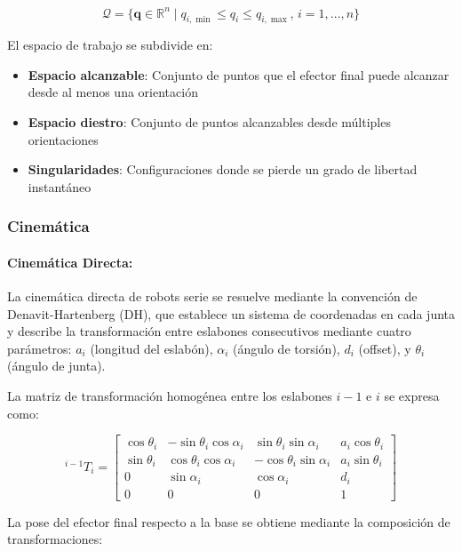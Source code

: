 \begin{equation}
\mathcal{Q} = \{\mathbf{q} \in \mathbb{R}^n \mid q_{i,\min} \leq q_i \leq q_{i,\max}, \, i = 1, \ldots, n\}
\end{equation}

El espacio de trabajo se subdivide en:

\begin{itemize}
    \item \textbf{Espacio alcanzable}: Conjunto de puntos que el efector final puede alcanzar desde al menos una orientación
    \item \textbf{Espacio diestro}: Conjunto de puntos alcanzables desde múltiples orientaciones
    \item \textbf{Singularidades}: Configuraciones donde se pierde un grado de libertad instantáneo
\end{itemize}

\subsubsection{Cinemática}

\paragraph{Cinemática Directa:} 

La cinemática directa de robots serie se resuelve mediante la convención de Denavit-Hartenberg (DH), que establece un sistema de coordenadas en cada junta y describe la transformación entre eslabones consecutivos mediante cuatro parámetros: $a_i$ (longitud del eslabón), $\alpha_i$ (ángulo de torsión), $d_i$ (offset), y $\theta_i$ (ángulo de junta).

La matriz de transformación homogénea entre los eslabones $i-1$ e $i$ se expresa como:

\begin{equation}
{}^{i-1}T_i = 
\begin{bmatrix}
\cos\theta_i & -\sin\theta_i\cos\alpha_i & \sin\theta_i\sin\alpha_i & a_i\cos\theta_i \\
\sin\theta_i & \cos\theta_i\cos\alpha_i & -\cos\theta_i\sin\alpha_i & a_i\sin\theta_i \\
0 & \sin\alpha_i & \cos\alpha_i & d_i \\
0 & 0 & 0 & 1
\end{bmatrix}
\end{equation}

La pose del efector final respecto a la base se obtiene mediante la composición de transformaciones:

